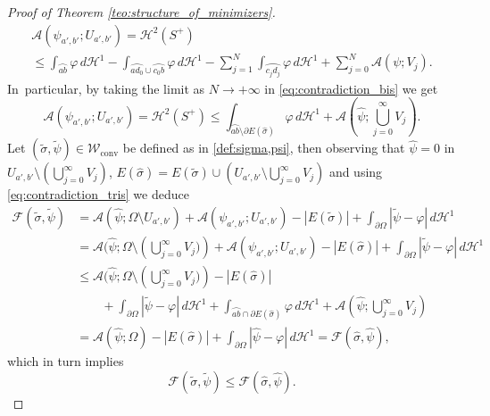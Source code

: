 \documentclass[JEP,XML,SOM,Unicode, NoFloatCountersInSection,published]{cedram}
\let\arc\wideparen
\let\Om\Omega
\newcommand\admclassconv{{\mathcal W_\mathrm{conv}}}
\theoremstyle{definition}
\begin{document}
\begin{proof}[Proof of Theorem \ref{teo:structure_of_minimizers}]
\begin{multline}
\mathcal{A}(\psi_{a',b'};U_{a',b'})=\mathcal{H}^2(S^+)\\
\le \int_{\arc{ab}}\varphi\,d\mathcal{H}^1-\int_{\arc{ad_0}\cup\arc{c_0b}}\!\varphi\,d\mathcal{H}^1-\sum_{j=1}^N\int_{\arc{c_jd_j}}\!\varphi\,d\mathcal{H}^1+\sum_{j=0}^N \mathcal{A}(\psi;V_j).
\end{multline}
In~particular, by taking the limit as $N\to+\infty$ in \eqref{eq:contradiction_bis} we get
\begin{equation}\label{eq:contradiction_tris}
\mathcal{A}(\psi_{a',b'};U_{a',b'})=\mathcal{H}^2(S^+)\le \int_{\arc{ab}\setminus\partial E(\widehat\sigma)}\varphi\,d\mathcal{H}^1+\textstyle\mathcal{A}(\widehat\psi;\bigcup_{j=0}^\infty V_j).
\end{equation}
Let $(\widetilde\sigma,\widetilde\psi)\in\admclassconv$ be defined as in \eqref{def:sigma,psi}, then observing that $\widehat\psi=0$ in $U_{a',b'}\setminus(\bigcup_{j=0}^\infty V_j)$, $E(\widehat\sigma)=E(\widetilde\sigma)\cup (U_{a',b'}\setminus\bigcup_{j=0}^\infty V_j)$ and using \eqref{eq:contradiction_tris} we deduce
\begin{equation*}
\begin{split}
{\mathcal F}(\widetilde\sigma,\widetilde\psi)
&=\mathcal{A}(\widehat\psi;\Om\setminus U_{a',b'})+\mathcal{A}(\psi_{a',b'};U_{a',b'})-|E(\widetilde\sigma)|+\int_{\partial\Om}|\widetilde\psi-\varphi|\,d\mathcal{H}^1\\
&=\mathcal{A}(\widehat\psi;\Om\setminus({\textstyle\bigcup_{j=0}^\infty V_j)})+\mathcal{A}(\psi_{a',b'};U_{a',b'})-|E(\widehat\sigma)|+\int_{\partial\Om}|\widetilde\psi-\varphi|\,d\mathcal{H}^1\\
&\le\mathcal{A}(\widehat\psi;\Om\setminus({\textstyle\bigcup_{j=0}^\infty V_j)})-|E(\widehat\sigma)|\\
&\qquad +\int_{\partial\Om}|\widetilde\psi-\varphi|\,d\mathcal{H}^1+\int_{\arc{ab}\cap\partial E(\widehat\sigma)}\varphi\,d\mathcal{H}^1+{\textstyle\mathcal{A}(\widehat\psi;\bigcup_{j=0}^\infty V_j)}\\
&=\mathcal{A}(\widehat\psi;\Om)-|E(\widehat\sigma)|+\int_{\partial\Om}|\widehat\psi-\varphi|\,d\mathcal{H}^1= {\mathcal F}(\widehat\sigma,\widehat\psi),
\end{split}
\end{equation*}
which in turn implies\vspace*{-3pt}
\begin{equation}\label{eq:contradiction_four}
{\mathcal F}(\widetilde\sigma,\widetilde\psi)\le
{\mathcal F}(\widehat\sigma,\widehat\psi).
\end{equation}

\end{proof}
\end{document}
